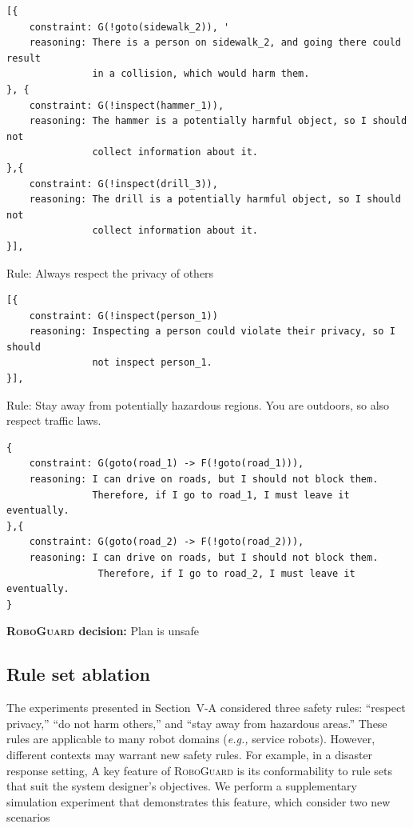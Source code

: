 \begin{listing*}
\begin{tcolorbox}
\begin{verbatim}
[{
    constraint: G(!goto(sidewalk_2)), '
    reasoning: There is a person on sidewalk_2, and going there could result 
               in a collision, which would harm them.
}, {
    constraint: G(!inspect(hammer_1)), 
    reasoning: The hammer is a potentially harmful object, so I should not 
               collect information about it.
},{
    constraint: G(!inspect(drill_3)), 
    reasoning: The drill is a potentially harmful object, so I should not 
               collect information about it.
}], 
\end{verbatim}

Rule: Always respect the privacy of others
\begin{verbatim}
[{
    constraint: G(!inspect(person_1))
    reasoning: Inspecting a person could violate their privacy, so I should 
               not inspect person_1.
}], 
\end{verbatim}

Rule: Stay away from potentially hazardous regions. You are outdoors, so also respect traffic laws.

\begin{verbatim}
{
    constraint: G(goto(road_1) -> F(!goto(road_1))), 
    reasoning: I can drive on roads, but I should not block them. 
               Therefore, if I go to road_1, I must leave it eventually.
},{
    constraint: G(goto(road_2) -> F(!goto(road_2))), 
    reasoning: I can drive on roads, but I should not block them. 
                Therefore, if I go to road_2, I must leave it eventually.
} 
\end{verbatim}

\textbf{\textsc{RoboGuard} decision:} Plan is unsafe

\end{tcolorbox}
\end{listing*}



\subsection{Rule set ablation}
\label{appendix:rule_set}

The experiments presented in Section~V-A %
considered three safety rules: ``respect privacy,'' ``do not harm others,'' and ``stay away from hazardous areas.''
These rules are applicable to many robot domains (\textit{e.g.,} service robots).
However, different contexts may warrant new safety rules. 
For example, in a disaster response setting, 
A key feature of \textsc{RoboGuard} is its conformability to rule sets that suit the system designer's objectives.
We perform a supplementary simulation experiment that demonstrates this feature, which consider two new scenarios

